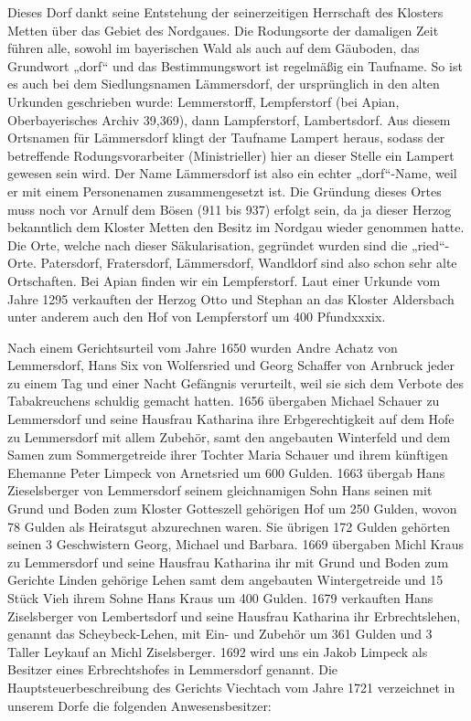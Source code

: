 \documentclass[12pt,a4pager]{book}
\begin{document}
Dieses Dorf dankt seine Entstehung der seinerzeitigen Herrschaft des Klosters
Metten über das Gebiet des Nordgaues. Die Rodungsorte der damaligen Zeit führen
alle, sowohl im bayerischen Wald als auch auf dem Gäuboden, das Grundwort „dorf“
und das Bestimmungswort ist regelmäßig ein Taufname. So ist es auch bei dem
Siedlungsnamen Lämmersdorf, der ursprünglich in den alten Urkunden geschrieben
wurde: Lemmerstorff, Lempferstorf (bei Apian, Oberbayerisches Archiv 39,369),
dann Lampferstorf, Lambertsdorf. Aus diesem Ortsnamen für Lämmersdorf klingt der
Taufname Lampert heraus, sodass der betreffende Rodungsvorarbeiter
(Ministrieller) hier an dieser Stelle ein Lampert gewesen sein wird. Der Name
Lämmersdorf ist also ein echter „dorf“-Name, weil er mit einem Personenamen
zusammengesetzt ist. Die Gründung dieses Ortes muss noch vor Arnulf dem Bösen
(911 bis 937) erfolgt sein, da ja dieser Herzog bekanntlich dem Kloster Metten
den Besitz im Nordgau wieder genommen hatte. Die Orte, welche nach dieser
Säkularisation, gegründet wurden sind die „ried“-Orte. Patersdorf, Fratersdorf,
Lämmersdorf, Wandldorf sind also schon sehr alte Ortschaften. Bei Apian finden
wir ein Lempferstorf. Laut einer Urkunde vom Jahre 1295 verkauften der Herzog
Otto und Stephan an das Kloster Aldersbach unter anderem auch den Hof von
Lempferstorf um 400 Pfundxxxix.

Nach einem Gerichtsurteil vom Jahre 1650 wurden Andre Achatz von Lemmersdorf,
Hans Six von Wolfersried und Georg Schaffer von Arnbruck jeder zu einem Tag und
einer Nacht Gefängnis verurteilt, weil sie sich dem Verbote des Tabakreuchens
schuldig gemacht hatten. 1656 übergaben Michael Schauer zu Lemmersdorf und seine
Hausfrau Katharina ihre Erbgerechtigkeit auf dem Hofe zu Lemmersdorf mit allem
Zubehör, samt den angebauten Winterfeld und dem Samen zum Sommergetreide ihrer
Tochter Maria Schauer und ihrem künftigen Ehemanne Peter Limpeck von Arnetsried
um 600 Gulden. 1663 übergab Hans Zieselsberger von Lemmersdorf seinem
gleichnamigen Sohn Hans seinen mit Grund und Boden zum Kloster Gotteszell
gehörigen Hof um 250 Gulden, wovon 78 Gulden als Heiratsgut abzurechnen waren.
Sie übrigen 172 Gulden gehörten seinen 3 Geschwistern Georg, Michael und
Barbara. 1669 übergaben Michl Kraus zu Lemmersdorf und seine Hausfrau Katharina
ihr mit Grund und Boden zum Gerichte Linden gehörige Lehen samt dem angebauten
Wintergetreide und 15 Stück Vieh ihrem Sohne Hans Kraus um 400 Gulden. 1679
verkauften Hans Ziselsberger von Lembertsdorf und seine Hausfrau Katharina ihr
Erbrechtslehen, genannt das Scheybeck-Lehen, mit Ein- und Zubehör um 361 Gulden
und 3 Taller Leykauf an Michl Ziselsberger. 1692 wird uns ein Jakob Limpeck als
Besitzer eines Erbrechtshofes in Lemmersdorf genannt. Die
Hauptsteuerbeschreibung des Gerichts Viechtach vom Jahre 1721 verzeichnet in
unserem Dorfe die folgenden Anwesensbesitzer:
\end{document}
